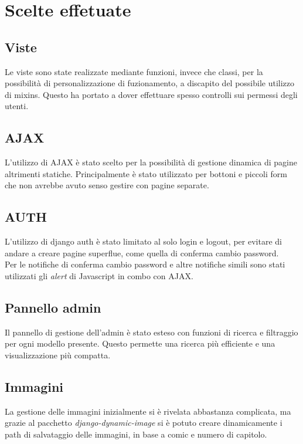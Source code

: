 \section{Scelte effetuate}

\subsection{Viste}
Le viste sono state realizzate mediante funzioni, invece che classi,
per la possibilità di personalizzazione di fuzionamento,
a discapito del possibile utilizzo di mixins.
Questo ha portato a dover effettuare spesso controlli sui permessi degli utenti.

\subsection{AJAX}
L'utilizzo di AJAX è stato scelto per la possibilità di gestione dinamica
di pagine altrimenti statiche. Principalmente è stato utilizzato per bottoni
e piccoli form che non avrebbe avuto senso gestire con pagine separate.

\subsection{AUTH}
L'utilizzo di django auth è stato limitato al solo login e logout,
per evitare di andare a creare pagine superflue, come quella di conferma cambio password.
\\Per le notifiche di conferma cambio password e altre notifiche simili sono stati utilizzati
gli \textit{alert} di Javascript in combo con AJAX.

\subsection{Pannello admin}
Il pannello di gestione dell'admin è stato esteso con funzioni di ricerca e filtraggio per ogni modello presente.
Questo permette una ricerca più efficiente e una visualizzazione più compatta.

\subsection{Immagini}
La gestione delle immagini inizialmente si è rivelata abbastanza complicata,
ma grazie al pacchetto \textit{django-dynamic-image} si è potuto creare dinamicamente
i path di salvataggio delle immagini, in base a comic e numero di capitolo.